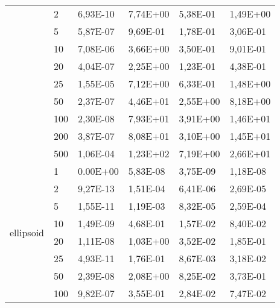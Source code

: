 \begin{longtable}[c]{|p{3.5cm}|l|l|l|l|l|}
                                        & 2         & 6,93E-10   & 7,74E+00   & 5,38E-01   & 1,49E+00  \\ \cline{2-6} 
                                        & 5         & 5,87E-07   & 9,69E-01   & 1,78E-01   & 3,06E-01  \\ \cline{2-6} 
                                        & 10        & 7,08E-06   & 3,66E+00   & 3,50E-01   & 9,01E-01  \\ \cline{2-6} 
                                        & 20        & 4,04E-07   & 2,25E+00   & 1,23E-01   & 4,38E-01  \\ \cline{2-6} 
                                        & 25        & 1,55E-05   & 7,12E+00   & 6,33E-01   & 1,48E+00  \\ \cline{2-6} 
                                        & 50        & 2,37E-07   & 4,46E+01   & 2,55E+00   & 8,18E+00  \\ \cline{2-6} 
                                        & 100       & 2,30E-08   & 7,93E+01   & 3,91E+00   & 1,46E+01  \\ \cline{2-6} 
                                        & 200       & 3,87E-07   & 8,08E+01   & 3,10E+00   & 1,45E+01  \\ \cline{2-6} 
                                        & 500       & 1,06E-04   & 1,23E+02   & 7,19E+00   & 2,66E+01  \\ \hline
\multirow[t]{10}{*}{ellipsoid}             & 1         & 0.00E+00   & 5,83E-08   & 3,75E-09   & 1,18E-08  \\ \cline{2-6} 
                                        & 2         & 9,27E-13   & 1,51E-04   & 6,41E-06   & 2,69E-05  \\ \cline{2-6} 
                                        & 5         & 1,55E-11   & 1,19E-03   & 8,32E-05   & 2,59E-04  \\ \cline{2-6} 
                                        & 10        & 1,49E-09   & 4,68E-01   & 1,57E-02   & 8,40E-02  \\ \cline{2-6} 
                                        & 20        & 1,11E-08   & 1,03E+00   & 3,52E-02   & 1,85E-01  \\ \cline{2-6} 
                                        & 25        & 4,93E-11   & 1,76E-01   & 8,67E-03   & 3,18E-02  \\ \cline{2-6} 
                                        & 50        & 2,39E-08   & 2,08E+00   & 8,25E-02   & 3,73E-01  \\ \cline{2-6} 
                                        & 100       & 9,82E-07   & 3,55E-01   & 2,84E-02   & 7,47E-02  \\ \cline{2-6} 

\end{longtable}
